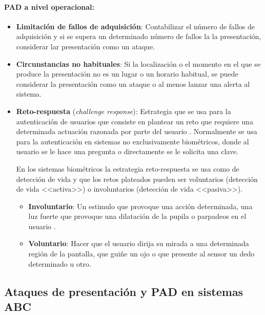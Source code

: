 \paragraph{PAD a nivel operacional:}
\begin{itemize}
    \item 
    \textbf{Limitación de fallos de adquisición}: Contabilizar el número de fallos de adquisición y si se supera un determinado número de fallos la la presentación, considerar lar presentación como un ataque.
    \item
    \textbf{Circunstancias no habituales}: Si la localización o el momento en el que se produce la presentación no es un lugar o un horario habitual, se puede considerar la presentación como un ataque o al menos lanzar una alerta al sistema.  
    \item
    \textbf{Reto-respuesta} (\textit{\gls{challenge response}}): Estrategia que se usa para la autenticación de usuarios que consiste en plantear un reto que requiere una determinada actuación razonada por parte del usuario \cite{shoukry2015pycra}. Normalmente se usa para la autenticación en sistemas no exclusivamente biométricos, donde al usuario se le hace una pregunta o directamente se le solicita una clave.
    
    En los sistemas biométricos la estrategia reto-respuesta se usa como  de detección de vida y que los retos plateados pueden ser voluntarios (detección de vida <<activa>>) o involuntarios (detección de vida <<pasiva>>).
    
    \begin{itemize}
        \item
        \textbf{Involuntario}: 
        Un estimulo que provoque una acción determinada, una luz fuerte que provoque una dilatación de la pupila o parpadeos en el usuario \cite{rigas2015eye}.
        \item
        \textbf{Voluntario}:
        Hacer que el usuario dirija su mirada a una determinada región de la pantalla, que guiñe un ojo o que presente al sensor un dedo determinado u otro.
    \end{itemize} 
\end{itemize}

\subsection{Ataques de presentación y PAD en sistemas ABC}\label{subsec:PA-biometriasABC}

